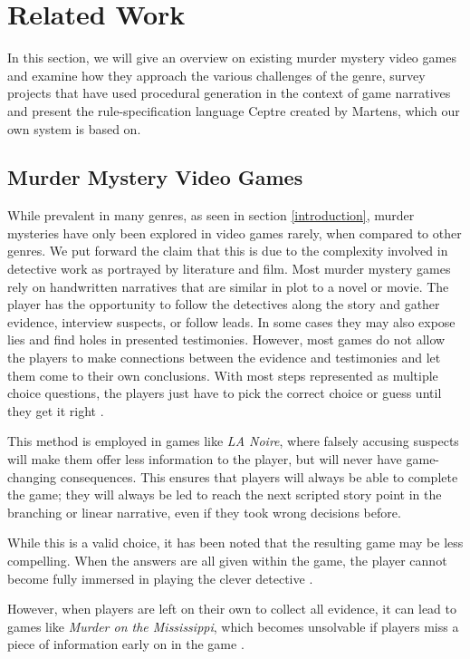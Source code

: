 \section{Related Work} \label{related_work}

In this section, we will give an overview on existing murder mystery video games and examine how they approach the various challenges of the genre, survey projects that have used procedural generation in the context of game narratives and present the rule-specification language Ceptre created by Martens, which our own system is based on.

\subsection{Murder Mystery Video Games}

While prevalent in many genres, as seen in section \ref{introduction}, murder mysteries have only been explored in video games rarely, when compared to other genres.
We put forward the claim that this is due to the complexity involved in detective work as portrayed by literature and film.
Most murder mystery games rely on handwritten narratives that are similar in plot to a novel or movie.
The player has the opportunity to follow the detectives along the story and gather evidence, interview suspects, or follow leads.
In some cases they may also expose lies and find holes in presented testimonies.
However, most games do not allow the players to make connections between the evidence and testimonies and let them come to their own conclusions. With most steps represented as multiple choice questions, the players just have to pick the correct choice or guess until they get it right \cite{brown_2017}. 

This method is employed in games like \emph{LA Noire}, where falsely accusing suspects will make them offer less information to the player, but will never have game-changing consequences.
This ensures that players will always be able to complete the game; they will always be led to reach the next scripted story point in the branching or linear narrative, even if they took wrong decisions before.

While this is a valid choice, it has been noted that the resulting game may be less compelling.
When the answers are all given within the game, the player cannot become fully immersed in playing the clever detective \cite{goldstein_2018}.

However, when players are left on their own to collect all evidence, it can lead to games like \emph{Murder on the Mississippi}, which becomes unsolvable if players miss a piece of information early on in the game \cite{petit_2018}.

